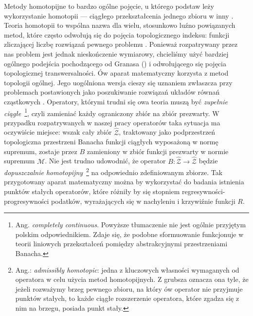 	Metody homotopijne to bardzo ogólne pojęcie, u którego podstaw leży wykorzystanie homotopii --- ciągłego przekształcenia jednego zbioru w inny \citep[ogólnie o homotopiach -- patrz:][str. 315]{Dugundji}. Teoria homotopii to wspólna nazwa dla wielu, stosunkowo luźno powiązanych metod, które  często odwołują się do pojęcia topologicznego indeksu: funkcji zliczającej liczbę rozwiązań pewnego problemu \citep[patrz:][str. 239]{Granas_FPT}. Ponieważ rozpatrywany przez nas problem jest jednak nieskończenie wymiarowy, chcieliśmy użyć bardziej ogólnego podejścia pochodzącego od Granasa (\citeyear{Granas_1980, Granas_FPT}) i odwołującego się pojęcia topologicznej transwersalności. Ów aparat matematyczny korzysta z metod topologii ogólnej. Jego uogólniona wersja cieszy się uznaniem zwłaszcza przy problemach postawionych jako poszukiwanie rozwiązań układów równań cząstkowych \citep[patrz:][]{Precup_1995}. Operatory, którymi trudni się owa teoria muszą być {\it zupełnie ciągłe}~\footnote{Ang. {\it completely continuous}. Powyższe tłumaczenie nie jest ogólnie przyjętym polskim odpowiednikiem. Zdaje się, że podobne sformuowanie funkcjonuje w teorii liniowych przekształceń pomiędzy abstrakcyjnymi przestrzeniami Banacha.}, czyli zamieniać każdy ograniczony zbiór na zbiór prezwarty. W przypadku rozpatrywanych w naszej pracy operatorów taka sytuacja ma oczywiście miejsce: wszak cały zbiór $\hat{\mathcal{Z}}$, traktowany jako podprzestrzeń topologiczna przestrzeni Banacha funkcji ciągłych wyposażoną w normę supremum, zostaje przez $B$ zamieniony w zbiór funkcji prezwarty w normie supremum $\mathcal{M}$. Nie jest trudno udowodnić, że operator $B: \hat{\mathcal{Z}} \rightarrow \hat{\mathcal{Z}}$ będzie {\it dopuszczalnie homotopijny}~\footnote{Ang.: {\it admissibly homotopic}: jedna z kluczowych własności wymaganych od operatora w celu użycia metod homotopijnych. Z grubsza oznacza ona tyle, że jeżeli rozważymy brzeg pewnego zbioru, na który ów operator nie przyjmuje punktów stałych, to każde ciągłe rozszerzenie operatora, które zgadza się z nim na brzegu, posiada punkt stały.} na odpowiednio zdefiniowanym zbiorze. Tak przygotowany aparat matematyczny można by wykorzystać do badania istnienia punktów stałych operatorów, które różniły by się stopniem regresywności-progresywności podatków, wyrażających się w nachyleniu i krzywiźnie funkcji $R$.  

